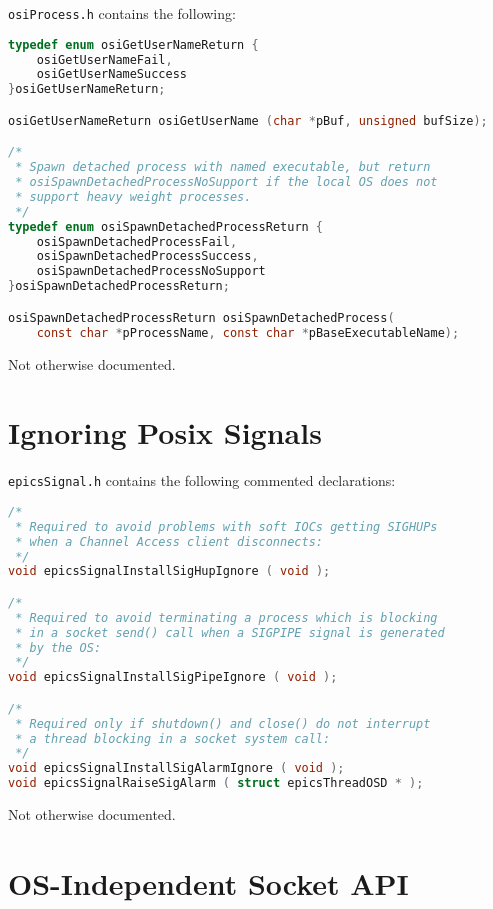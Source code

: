 \verb|osiProcess.h| contains the following:

\begin{lstlisting}[language=C]
typedef enum osiGetUserNameReturn {
    osiGetUserNameFail,
    osiGetUserNameSuccess
}osiGetUserNameReturn;

osiGetUserNameReturn osiGetUserName (char *pBuf, unsigned bufSize);

/*
 * Spawn detached process with named executable, but return
 * osiSpawnDetachedProcessNoSupport if the local OS does not
 * support heavy weight processes.
 */
typedef enum osiSpawnDetachedProcessReturn {
    osiSpawnDetachedProcessFail,
    osiSpawnDetachedProcessSuccess,
    osiSpawnDetachedProcessNoSupport
}osiSpawnDetachedProcessReturn;

osiSpawnDetachedProcessReturn osiSpawnDetachedProcess(
    const char *pProcessName, const char *pBaseExecutableName);

\end{lstlisting}

Not otherwise documented.

\section{Ignoring Posix Signals}

\verb|epicsSignal.h| contains the following commented declarations:

\begin{lstlisting}[language=C]
/*
 * Required to avoid problems with soft IOCs getting SIGHUPs
 * when a Channel Access client disconnects:
 */
void epicsSignalInstallSigHupIgnore ( void );

/*
 * Required to avoid terminating a process which is blocking
 * in a socket send() call when a SIGPIPE signal is generated
 * by the OS:
 */
void epicsSignalInstallSigPipeIgnore ( void );

/*
 * Required only if shutdown() and close() do not interrupt
 * a thread blocking in a socket system call:
 */
void epicsSignalInstallSigAlarmIgnore ( void );
void epicsSignalRaiseSigAlarm ( struct epicsThreadOSD * );
\end{lstlisting}

Not otherwise documented.

\section{OS-Independent Socket API}

